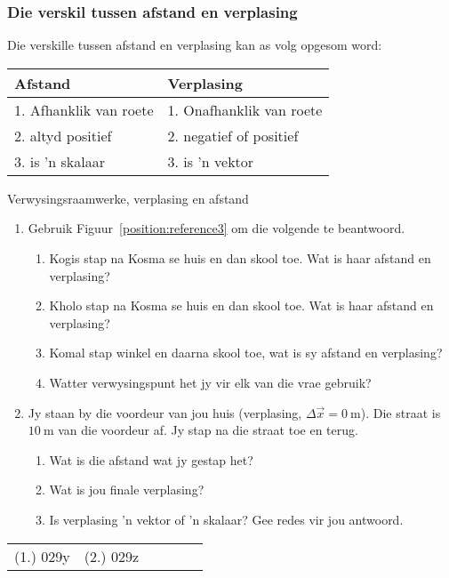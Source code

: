 \subsubsection*{Die verskil tussen afstand en verplasing}
            \nopagebreak
Die verskille tussen afstand en verplasing kan as volg opgesom word:\par
\begin{center}
\begin{tabular}{|l|l|}\hline
\textbf{ Afstand} & \textbf{ Verplasing} \\\hline
1. Afhanklik van roete & 1. Onafhanklik van roete \\\hline
2. altyd positief & 2. negatief of positief \\\hline
3. is 'n skalaar & 3. is 'n vektor\\\hline
\end{tabular}
\end{center}
    \par
\label{m38788*secfhsst!!!underscore!!!id498}
\begin{exercises}{Verwysingsraamwerke, verplasing en afstand}
\nopagebreak \noindent
\begin{enumerate}[noitemsep, label=\textbf{\arabic*}. ] 
\item Gebruik Figuur~\ref{position:reference3} om die volgende te beantwoord.
\begin{enumerate}[noitemsep, label=\textbf{\alph*}. ] 
    \item Kogis stap na Kosma se huis en dan skool toe. Wat is haar afstand en verplasing?
    \item Kholo stap na Kosma se huis en dan skool toe. Wat is haar afstand en verplasing?
    \item Komal stap winkel en daarna skool toe, wat is sy afstand en verplasing?
    \item Watter verwysingspunt het jy vir elk van die vrae gebruik?
\end{enumerate}
                
\item Jy staan by die voordeur van jou huis (verplasing, $\Delta \vec{x}=0~\text{m}$). Die straat is $10~\text{m}$ van die voordeur af. Jy stap na die straat toe en terug.
\begin{enumerate}[noitemsep, label=\textbf{\alph*}. ] 
    \item Wat is die afstand wat jy gestap het?
    \item Wat is jou finale verplasing?
    \item Is verplasing 'n vektor of 'n skalaar? Gee redes vir jou antwoord.
\end{enumerate}
\end{enumerate}
  \label{m38788**end}
\practiceinfo
 \par \begin{tabular}[h]{cccccc}
 (1.) 029y  &  (2.) 029z  & \end{tabular}
\end{exercises}




